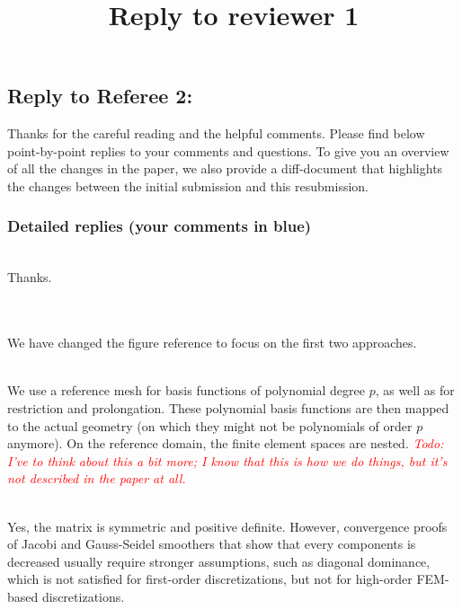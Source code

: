 \documentclass[12pt]{article}
\title{Reply to reviewer 1}
\newcommand{\todo}[1]{\noindent\emph{\textcolor{red}{Todo: #1\:}}}
\newcommand{\referee}[1]{\vspace{3ex}\noindent{\textcolor{blue}{#1}}\\[2ex]}
\begin{document}
\subsection*{Reply to Referee 2:}

Thanks for the careful reading and the helpful comments.
Please find below point-by-point replies to your comments and
questions. To give you an overview of all the changes in the paper, we
also provide a diff-document that highlights the changes between the
initial submission and this resubmission.

\subsubsection*{Detailed replies (your comments in blue)}

\referee{ Comments to the Author\\[.2ex] The paper presents a very
  nice computational survey of the most natural (and popular)
  approaches for the application of geometric Multigrid to second
  order elliptic problems discretized with high-order finite
  elements. This is timely and interesting study, given the increasing
  importance of high-order methods on modern computing
  architectures. The authors are to be commended for the interesting
  choice of problems (high-order meshes, polynomial orders up to 16,
  etc.) as well as for the freely available companion Matlab
  software. I liked the presentation and I found the results
  interesting.}
\noindent
Thanks.

\referee{ I therefore recommend the manuscript for publication with
  the following minor remarks:}

\referee{ 1) Section 2 refers to Figure 1 (first paragraph on page 4),
  but discusses only the first two approaches depicted there. This can
  be confusing.}
\noindent 
We have changed the figure reference to focus on the first two approaches. 

\referee{ 2) Why are the h-Multigrid spaces nested for the domains in
  Figure 4?}
\noindent
We use a reference mesh for basis functions of polynomial degree $p$,
as well as for restriction and prolongation. These polynomial basis
functions are then mapped to the actual geometry (on which they might
not be polynomials of order $p$ anymore). On the reference domain, the
finite element spaces are nested.
\todo{I've to think about this a bit more; I know that this is how we
  do things, but it's not described in the paper at all.}

\referee{ 3) It looks like SSOR is amplifying some error components
  when used as a smoother in Figure 3 (e.g. for p=4). Isn't Ak SPD in
  this case?}
\noindent
Yes, the matrix is symmetric and positive definite. However,
convergence proofs of Jacobi and Gauss-Seidel smoothers that show that
every components is decreased usually require stronger assumptions,
such as diagonal dominance, which is not satisfied for first-order
discretizations, but not for high-order FEM-based discretizations.
\end{document}
